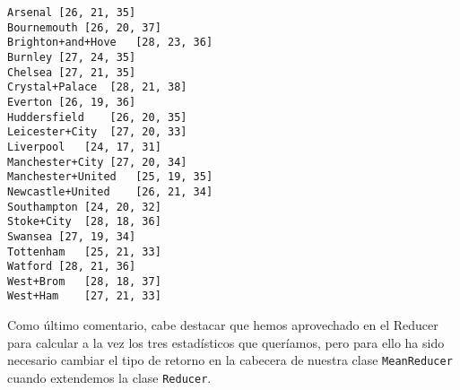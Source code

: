 \documentclass[11pt]{article}
\begin{document}
\begin{verbatim}
Arsenal	[26, 21, 35]
Bournemouth	[26, 20, 37]
Brighton+and+Hove	[28, 23, 36]
Burnley	[27, 24, 35]
Chelsea	[27, 21, 35]
Crystal+Palace	[28, 21, 38]
Everton	[26, 19, 36]
Huddersfield	[26, 20, 35]
Leicester+City	[27, 20, 33]
Liverpool	[24, 17, 31]
Manchester+City	[27, 20, 34]
Manchester+United	[25, 19, 35]
Newcastle+United	[26, 21, 34]
Southampton	[24, 20, 32]
Stoke+City	[28, 18, 36]
Swansea	[27, 19, 34]
Tottenham	[25, 21, 33]
Watford	[28, 21, 36]
West+Brom	[28, 18, 37]
West+Ham	[27, 21, 33]
\end{verbatim}

Como último comentario, cabe destacar que hemos aprovechado en el Reducer para calcular a la vez los tres estadísticos que queríamos, pero para ello ha sido necesario cambiar el tipo de retorno en la cabecera de nuestra clase \verb|MeanReducer| cuando extendemos la clase \verb|Reducer|.
\end{document}
